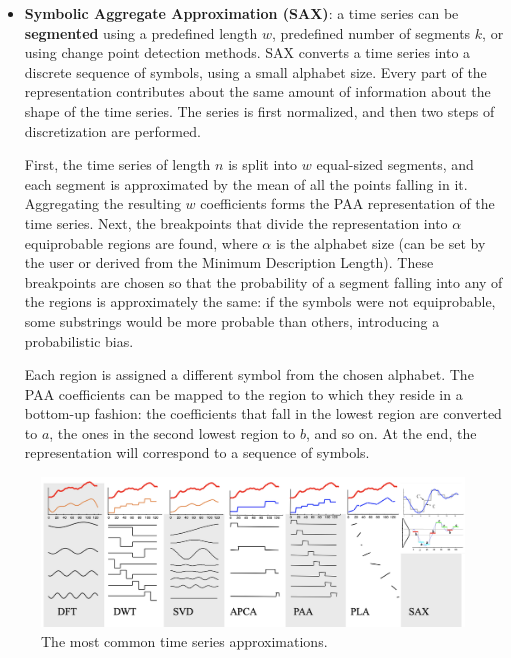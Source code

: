 \begin{itemize}
    \item \textbf{Symbolic Aggregate Approximation (SAX)}: a time series can be \textbf{segmented} using a predefined length $w$, predefined number of segments $k$, or using change point detection methods. SAX converts a time series into a discrete sequence of symbols, using a small alphabet size. Every part of the representation contributes about the same amount of information about the shape of the time series. The series is first normalized, and then two steps of discretization are performed.

    First, the time series of length $n$ is split into $w$ equal-sized segments, and each segment is approximated by the mean of all the points falling in it. Aggregating the resulting $w$ coefficients forms the PAA representation of the time series. Next, the breakpoints that divide the representation into $\alpha$ equiprobable regions are found, where $\alpha$ is the alphabet size (can be set by the user or derived from the Minimum Description Length). These breakpoints are chosen so that the probability of a segment falling into any of the regions is approximately the same: if the symbols were not equiprobable, some substrings would be more probable than others, introducing a probabilistic bias.

    Each region is assigned a different symbol from the chosen alphabet. The PAA coefficients can be mapped to the region to which they reside in a bottom-up fashion: the coefficients that fall in the lowest region are converted to $a$, the ones in the second lowest region to $b$, and so on. At the end, the representation will correspond to a sequence of symbols.
\end{itemize}
\clearpage
\begin{figure}[h]
    \centering
    \includegraphics[width=1.0\linewidth]{img/approximations.png}
    \caption{The most common time series approximations.}
    \label{fig:approx-ts}
\end{figure}